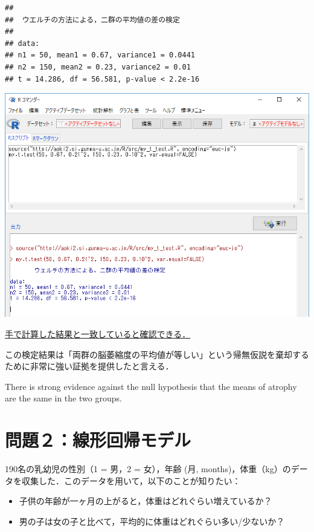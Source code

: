\documentclass[11pt,]{problemset}
\begin{document}
\begin{verbatim}
## 
##  ウエルチの方法による，二群の平均値の差の検定
## 
## data:  
## n1 = 50, mean1 = 0.67, variance1 = 0.0441
## n2 = 150, mean2 = 0.23, variance2 = 0.01
## t = 14.286, df = 56.581, p-value < 2.2e-16
\end{verbatim}

\begin{center}\includegraphics[width=0.9\linewidth]{pic/myttest02} \end{center}
\bigskip

\underline{手で計算した結果と一致していると確認できる．}

この検定結果は「両群の脳萎縮度の平均値が等しい」という帰無仮説を棄却するために非常に強い証拠を提供したと言える．

There is strong evidence against the null hypothesis that the means of
atrophy are the same in the two groups.

\newpage
\vfill

\section{問題２：線形回帰モデル}

190名の乳幼児の性別（1 = 男，2 = 女），年齢 (月,
months)，体重（kg）のデータを収集した．このデータを用いて，以下のことが知りたい：

\begin{itemize}
\item
  子供の年齢が一ヶ月の上がると，体重はどれぐらい増えているか？
\item
  男の子は女の子と比べて，平均的に体重はどれぐらい多い/少ないか？
\end{itemize}
\end{document}
